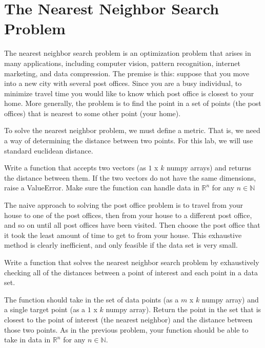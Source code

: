 \label{lab:NNS}


\section*{The Nearest Neighbor Search Problem}

The nearest neighbor search problem is an optimization problem that arises in many applications, including computer vision, pattern recognition, internet marketing, and data compression.
The premise is this: suppose that you move into a new city with several post offices.
Since you are a busy individual, to minimize travel time you would like to know which post office is closest to your home.
More generally, the problem is to find the point in a set of points (the post offices) that is nearest to some other point (your home).

\begin{problem}
To solve the nearest neighbor problem, we must define a metric.
That is, we need a way of determining the distance between two points.
For this lab, we will use standard euclidean distance.

Write a function that accepts two vectors (as $1$ x $k$ numpy arrays) and returns the distance between them.
If the two vectors do not have the same dimensions, raise a ValueError.
Make sure the function can handle data in $\mathbb{R}^n$ for any $n\in\mathbb{N}$
\end{problem}


The naive approach to solving the post office problem is to travel from your house to one of the post offices, then from your house to a different post office, and so on until all post offices have been visited. Then choose the post office that it took the least amount of time to get to from your house. This exhaustive method is clearly inefficient, and only feasible if the data set is very small.

\begin{problem}
Write a function that solves the nearest neighbor search problem by exhaustively checking all of the distances between a point of interest and each point in a data set.

The function should take in the set of data points (as a $m$ x $k$ numpy array) and a single target point (as a $1$ x $k$ numpy array).
Return the point in the set that is closest to the point of interest (the nearest neighbor) and the distance between those two points. As in the previous problem, your function should be able to take in data in $\mathbb{R}^n$ for any $n\in\mathbb{N}$.
\end{problem}

